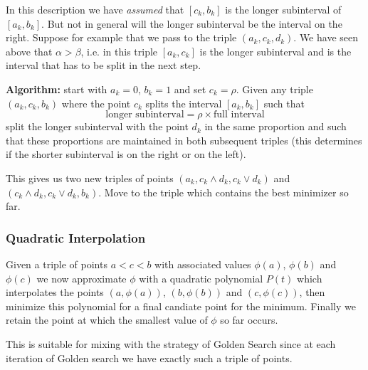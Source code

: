 In this description we have \textit{assumed} that $[c_k,b_k]$ is the longer subinterval of $[a_k,b_k]$.
But not in general will the longer subinterval be the interval on the right. Suppose for example that we pass to the
triple $(a_k,c_k,d_k)$. We have seen above that $\alpha>\beta$, i.e. in this triple $[a_k,c_k]$ is the longer subinterval
and is the interval that has to be split in the next step.

\medskip\noindent
\textbf{Algorithm:} start with $a_k=0$, $b_k=1$ and set $c_k=\rho$. Given any triple $(a_k,c_k,b_k)$
where the point $c_k$ splits the interval $[a_k,b_k]$ such that 
$$
\text{longer subinterval}=\rho\times\text{full interval}
$$
split the longer subinterval with the point $d_k$ in the same proportion and such that these proportions
are maintained in both subsequent triples (this determines if the shorter subinterval is on the right or
on the left).

This gives us two new triples of points $(a_k,c_k\wedge d_k, c_k\vee d_k)$ and $(c_k\wedge d_k, c_k\vee d_k, b_k)$.
Move to the triple which contains the best minimizer so far. 

\subsubsection{Quadratic Interpolation}
\label{sec:quadratic_approx}
 
Given a triple of points $a<c<b$ with associated values $\phi(a)$, $\phi(b)$ and $\phi(c)$ we now approximate 
$\phi$ with a quadratic polynomial $P(t)$ which interpolates the points $(a,\phi(a))$, $(b,\phi(b))$ and $(c,\phi(c))$,
then minimize this polynomial for a final candiate point for the minimum. Finally we retain the point at which the
smallest value of $\phi$ so far occurs.

This is suitable for mixing with the strategy of Golden Search since at each iteration of Golden search we have exactly 
such a triple of points.

